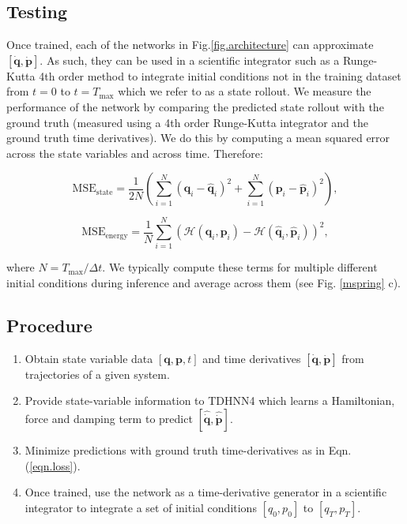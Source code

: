\documentclass[twoside]{article}
\begin{document}
\subsection*{Testing}
Once trained, each of the networks in Fig.\ref{fig.architecture} can approximate $[\dot{\mathbf{q}},\dot{\mathbf{p}}]$. As such, they can be used in a scientific integrator such as a Runge-Kutta 4th order method to integrate initial conditions not in the training dataset from $t=0$ to $t=T_{\max}$ which we refer to as a state rollout. We measure the performance of the network by comparing the predicted state rollout with the ground truth (measured using a 4th order Runge-Kutta integrator and the ground truth time derivatives). We do this by computing a mean squared error across the state variables and across time. Therefore:

\begin{equation}
\mathrm{MSE}_{\mathrm{state}} = \frac{1}{2N} \left(\sum_{i=1}^N (\mathbf{q}_i-\hat{\mathbf{q}}_i)^2 + \sum_{i=1}^N (\mathbf{p}_i - \hat{\mathbf{p}}_i)^2\right),
\end{equation}

\begin{equation}
\mathrm{MSE}_{\mathrm{energy}} = \frac{1}{N} \sum_{i=1}^N \left(\mathcal{H}(\mathbf{q}_i,\mathbf{p}_i)-\mathcal{H}(\hat{\mathbf{q}}_i,\hat{\mathbf{p}}_i)\right)^2,
\end{equation}

where $N = T_{\max}/\Delta t $. We typically compute these terms for multiple different initial conditions during inference and average across them (see Fig. \ref{mspring} c).



\subsection*{Procedure}

\begin{enumerate}
\item Obtain state variable data $[\mathbf{q},\mathbf{p},t]$ and time derivatives $[\dot{\mathbf{q}},\dot{\mathbf{p}}]$ from trajectories of a given system.
\item Provide state-variable information to TDHNN4 which learns a Hamiltonian, force and damping term to predict $[\hat{\dot{\mathbf{q}}},\hat{\dot{\mathbf{p}}}]$.
\item Minimize predictions with ground truth time-derivatives as in Eqn.(\ref{eqn.loss}).
\item Once trained, use the network as a time-derivative generator in a scientific integrator to integrate a set of initial conditions $[q_0,p_0]$ to $[q_T,p_T]$.
\end{enumerate}
\end{document}
